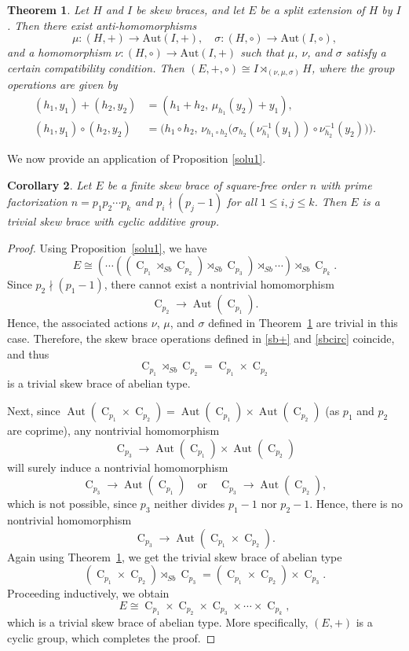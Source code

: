 \documentclass[11pt]{amsart}
\theoremstyle{thrm}
\theoremstyle{plain}
\newtheorem{thm}{Theorem}[section]
\newtheorem{cor}[thm]{Corollary}
\theoremstyle{definition}
\newcommand{\C}{\operatorname{C} }
\newcommand{\Aut}{\operatorname{Aut} }
\numberwithin{equation}{section}
\begin{document}
\begin{thm}\label{splitsbext}
	Let $H$ and $I$ be skew braces, and let $E$ be a split extension of $H$ by $I$.  Then there exist  anti-homomorphisms
	\[
	\mu : (H, +) \to \mathrm{Aut}(I, +), \quad 
	\sigma : (H, \circ) \to \mathrm{Aut}(I, \circ),
	\]
 and a homomorphism $\nu : (H, \circ) \to \mathrm{Aut}(I, +)$
such that $\mu$, $\nu$, and $\sigma$ satisfy a certain compatibility condition.  Then $(E, +, \circ)  \cong I \rtimes_{(\nu, \mu, \sigma)} H$, where  the group operations are given by
	\begin{align}
		(h_1, y_1) + (h_2, y_2) &= (h_1 + h_2,\, \mu_{h_1}(y_2) + y_1), \label{sb+} \\
		(h_1, y_1) \circ (h_2, y_2) &= \big(h_1 \circ h_2,\, 
		\nu_{h_1 \circ h_2}\big(\sigma_{h_2}(\nu_{h_1}^{-1}(y_1)) \circ \nu_{h_2}^{-1}(y_2)\big)\big). \label{sbcirc}
	\end{align}
\end{thm}


We now provide an application of Proposition \ref{solu1}.
\begin{cor}
	Let $E$ be a finite skew brace of square-free order $n$ with prime factorization  $n = p_1 p_2 \cdots p_k$ and $p_i \nmid (p_j - 1)$ for all $1 \leq i, j \leq k$. 
	Then $E$ is a trivial skew brace with cyclic additive group.
\end{cor}

\begin{proof}
	Using Proposition~\ref{solu1}, we have 
	\[
	E \cong (\cdots((\C_{p_1} \rtimes_{Sb} \C_{p_2}) \rtimes_{Sb} \C_{p_3}) \rtimes_{Sb} \cdots) \rtimes_{Sb} \C_{p_k}.
	\]
	Since $p_2 \nmid (p_1 - 1)$, there cannot exist a nontrivial homomorphism 
	\[
	\C_{p_2} \to \Aut(\C_{p_1}).
	\]
	Hence, the associated actions $\nu$, $\mu$, and $\sigma$ defined in Theorem~\ref{splitsbext} are trivial in this case. Therefore, the skew brace operations defined in \eqref{sb+} and \eqref{sbcirc} coincide, and thus 
	\[
	\C_{p_1} \rtimes_{Sb} \C_{p_2} = \C_{p_1} \times \C_{p_2}
	\]
	is a trivial skew brace of abelian type.  
	
	Next, since $\Aut(\C_{p_1} \times \C_{p_2}) = \Aut(\C_{p_1}) \times \Aut(\C_{p_2})$ (as $p_1$ and $p_2$ are coprime), any nontrivial homomorphism 
	\[
	\C_{p_3} \to \Aut(\C_{p_1}) \times \Aut(\C_{p_2})
	\]
	will surely induce a nontrivial homomorphism 
	\[
	\C_{p_3} \to \Aut(\C_{p_1}) \quad \text{or} \quad \C_{p_3} \to \Aut(\C_{p_2}),
	\]
	which is not possible, since $p_3$  neither divides $p_1 - 1$ nor $p_2 - 1$. Hence, there is no nontrivial homomorphism 
	\[
	\C_{p_3} \to \Aut(\C_{p_1} \times \C_{p_2}).
	\]
	Again using  Theorem~\ref{splitsbext}, we get the  trivial skew brace of abelian type
	\[
	(\C_{p_1} \times \C_{p_2}) \rtimes_{Sb} \C_{p_3} = (\C_{p_1} \times \C_{p_2}) \times \C_{p_3}.
	\]
  Proceeding inductively, we obtain
	\[
	E \cong \C_{p_1} \times \C_{p_2} \times \C_{p_3} \times \cdots \times \C_{p_k},
	\]
	which is a  trivial skew brace  of abelian type. More specifically, $(E, +)$ is a  cyclic group, which completes the proof.
\end{proof}
\end{document}
